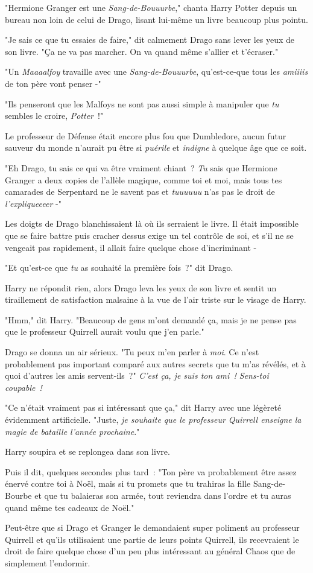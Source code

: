 "Hermione Granger est une \emph{Sang-de-Bouuurbe}," chanta Harry Potter depuis un bureau non loin de celui de Drago, lisant lui-même un livre beaucoup plus pointu.

"Je sais ce que tu essaies de faire," dit calmement Drago sans lever les yeux de son livre. "Ça ne va pas marcher. On va quand même s'allier et t'écraser."

"Un \emph{Maaaalfoy} travaille avec une \emph{Sang-de-Bouuurbe}, qu'est-ce-que tous les \emph{amiiiis} de ton père vont penser -"

"Ils penseront que les Malfoys ne sont pas aussi simple à manipuler que \emph{tu} sembles le croire, \emph{Potter}~!"

Le professeur de Défense était encore plus fou que Dumbledore, aucun futur sauveur du monde n'aurait pu être si \emph{puérile} et \emph{indigne} à quelque âge que ce soit.

"Eh Drago, tu sais ce qui va être vraiment chiant~? \emph{Tu} sais que Hermione Granger a deux copies de l'allèle magique, comme toi et moi, mais tous tes camarades de Serpentard ne le savent pas et \emph{tuuuuuu} n'as pas le droit de \emph{l'expliqueeeer} -"

Les doigts de Drago blanchissaient là où ils serraient le livre. Il était impossible que se faire battre puis cracher dessus exige un tel contrôle de soi, et s'il ne se vengeait pas rapidement, il allait faire quelque chose d'incriminant -

"Et qu'est-ce que \emph{tu} as souhaité la première fois~?" dit Drago.

Harry ne répondit rien, alors Drago leva les yeux de son livre et sentit un tiraillement de satisfaction malsaine à la vue de l'air triste sur le visage de Harry.

"Hmm," dit Harry. "Beaucoup de gens m'ont demandé ça, mais je ne pense pas que le professeur Quirrell aurait voulu que j'en parle."

Drago se donna un air sérieux. "Tu peux m'en parler à \emph{moi}. Ce n'est probablement pas important comparé aux autres secrets que tu m'as révélés, et à quoi d'autres les amis servent-ils~?" \emph{C'est ça, je suis ton ami~! Sens-toi coupable~!}

"Ce n'était vraiment pas si intéressant que ça," dit Harry avec une légèreté évidemment artificielle. "Juste, \emph{je souhaite que le professeur Quirrell enseigne la magie de bataille l'année prochaine}."

Harry soupira et se replongea dans son livre.

Puis il dit, quelques secondes plus tard~: "Ton père va probablement être assez énervé contre toi à Noël, mais si tu promets que tu trahiras la fille Sang-de-Bourbe et que tu balaieras son armée, tout reviendra dans l'ordre et tu auras quand même tes cadeaux de Noël."

Peut-être que si Drago et Granger le demandaient super poliment au professeur Quirrell et qu'ils utilisaient une partie de leurs points Quirrell, ils recevraient le droit de faire quelque chose d'un peu plus intéressant au général Chaos que de simplement l'endormir.~ 

